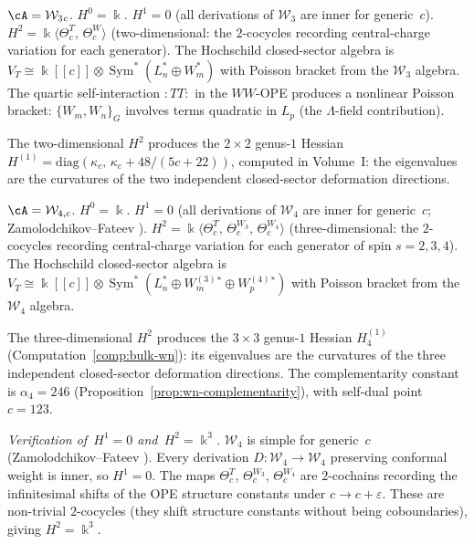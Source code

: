 \begin{computation}
\label{comp:bulk-w3}
$\cA=\mathcal W_3{}_c$. $H^0=\Bbbk$.
$H^1=0$ (all derivations of $\mathcal W_3$ are inner
for generic~$c$).
$H^2=\Bbbk\langle\Theta_c^T,\,\Theta_c^W\rangle$
(two-dimensional: the $2$-cocycles recording
central-charge variation for each generator).
The Hochschild closed-sector algebra is
$V_T\cong\Bbbk[[c]]\otimes
\operatorname{Sym}^*\!(L_n^*\oplus W_m^*)$
with Poisson bracket from the $\mathcal W_3$ algebra.
The quartic self-interaction ${:}TT{:}$ in the $WW$-OPE
produces a nonlinear Poisson bracket:
$\{W_m,W_n\}_G$ involves terms quadratic in $L_p$
(the $\Lambda$-field contribution).

The two-dimensional $H^2$ produces the $2\times 2$
genus-$1$ Hessian
$H^{(1)}=\mathrm{diag}(\kappa_c,\,\kappa_c+48/(5c+22))$,
computed in Volume~I:
the eigenvalues are the curvatures of the two independent
closed-sector deformation directions.
\end{computation}

\begin{computation}
\label{comp:bulk-w4}
$\cA=\mathcal W_{4,c}$. $H^0=\Bbbk$.
$H^1=0$ (all derivations of $\mathcal W_4$ are inner
for generic~$c$; Zamolodchikov--Fateev \cite{FL88}).
$H^2=\Bbbk\langle\Theta_c^T,\,\Theta_c^{W_3},\,
\Theta_c^{W_4}\rangle$ (three-dimensional: the $2$-cocycles
recording central-charge variation for each generator
of spin $s=2,3,4$).
The Hochschild closed-sector algebra is
$V_T\cong\Bbbk[[c]]\otimes
\operatorname{Sym}^*\!(L_n^*\oplus W^{(3)}_m{}^*
\oplus W^{(4)}_p{}^*)$
with Poisson bracket from the $\mathcal W_4$ algebra.

The three-dimensional $H^2$ produces the $3\times 3$
genus-$1$ Hessian $H^{(1)}_4$
(Computation~\ref{comp:bulk-wn}): its eigenvalues are
the curvatures of the three independent closed-sector deformation
directions. The complementarity constant is
$\alpha_4 = 246$ (Proposition~\ref{prop:wn-complementarity}),
with self-dual point $c = 123$.

\emph{Verification of~$H^1=0$ and~$H^2=\Bbbk^3$.}
$\mathcal W_4$ is simple for generic~$c$
(Zamolodchikov--Fateev \cite{FL88}). Every derivation
$D\colon \mathcal W_4 \to \mathcal W_4$ preserving
conformal weight is inner, so $H^1=0$. The maps
$\Theta_c^T$, $\Theta_c^{W_3}$, $\Theta_c^{W_4}$
are $2$-cochains recording
the infinitesimal shifts of the OPE structure constants under
$c \to c + \varepsilon$. These are non-trivial $2$-cocycles
(they shift structure constants without being coboundaries),
giving $H^2 = \Bbbk^3$.
\end{computation}

